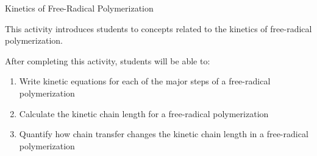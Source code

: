 %
%
%
%

\renewcommand{\figpath}{content}
\renewcommand{\labelbase}{FRPkinetics}

\begin{activity}{Kinetics of Free-Radical Polymerization}
\label{\labelbase}

\begin{instructornotes}
	This activity introduces students to concepts related to the kinetics of free-radical polymerization.
	
	After completing this activity, students will be able to:
	\begin{enumerate}
		\item Write kinetic equations for each of the major steps of a free-radical polymerization
		\item Calculate the kinetic chain length for a free-radical polymerization
		\item Quantify how chain transfer changes the kinetic chain length in a free-radical polymerization
	\end{enumerate}
	

\end{instructornotes}
\end{activity}
